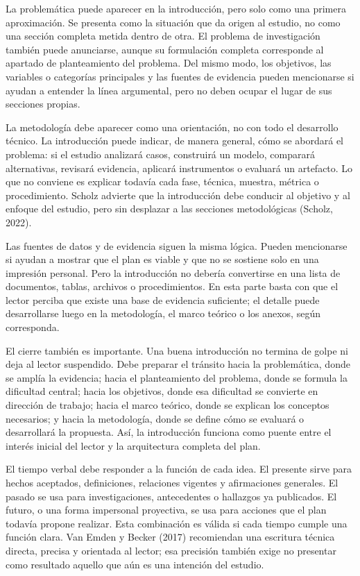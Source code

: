 \documentclass[11pt]{article}
\begin{document}
La problemática puede aparecer en la introducción, pero solo como una primera aproximación. Se presenta como la situación que da origen al estudio, no como una sección completa metida dentro de otra. El problema de investigación también puede anunciarse, aunque su formulación completa corresponde al apartado de planteamiento del problema. Del mismo modo, los objetivos, las variables o categorías principales y las fuentes de evidencia pueden mencionarse si ayudan a entender la línea argumental, pero no deben ocupar el lugar de sus secciones propias.

La metodología debe aparecer como una orientación, no con todo el desarrollo técnico. La introducción puede indicar, de manera general, cómo se abordará el problema: si el estudio analizará casos, construirá un modelo, comparará alternativas, revisará evidencia, aplicará instrumentos o evaluará un artefacto. Lo que no conviene es explicar todavía cada fase, técnica, muestra, métrica o procedimiento. Scholz advierte que la introducción debe conducir al objetivo y al enfoque del estudio, pero sin desplazar a las secciones metodológicas (Scholz, 2022).

Las fuentes de datos y de evidencia siguen la misma lógica. Pueden mencionarse si ayudan a mostrar que el plan es viable y que no se sostiene solo en una impresión personal. Pero la introducción no debería convertirse en una lista de documentos, tablas, archivos o procedimientos. En esta parte basta con que el lector perciba que existe una base de evidencia suficiente; el detalle puede desarrollarse luego en la metodología, el marco teórico o los anexos, según corresponda.

El cierre también es importante. Una buena introducción no termina de golpe ni deja al lector suspendido. Debe preparar el tránsito hacia la problemática, donde se amplía la evidencia; hacia el planteamiento del problema, donde se formula la dificultad central; hacia los objetivos, donde esa dificultad se convierte en dirección de trabajo; hacia el marco teórico, donde se explican los conceptos necesarios; y hacia la metodología, donde se define cómo se evaluará o desarrollará la propuesta. Así, la introducción funciona como puente entre el interés inicial del lector y la arquitectura completa del plan.

El tiempo verbal debe responder a la función de cada idea. El presente sirve para hechos aceptados, definiciones, relaciones vigentes y afirmaciones generales. El pasado se usa para investigaciones, antecedentes o hallazgos ya publicados. El futuro, o una forma impersonal proyectiva, se usa para acciones que el plan todavía propone realizar. Esta combinación es válida si cada tiempo cumple una función clara. Van Emden y Becker (2017) recomiendan una escritura técnica directa, precisa y orientada al lector; esa precisión también exige no presentar como resultado aquello que aún es una intención del estudio.
\end{document}
